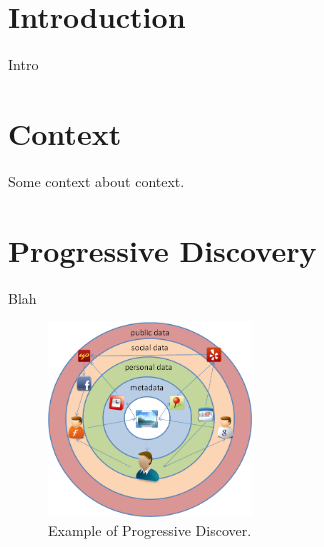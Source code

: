 \documentclass{sig-alternate}
\begin{document}


\section{Introduction}
Intro

\section{Context}
Some context about context.

\section{Progressive Discovery}
Blah \cite{westermann2007toward, gupta2011managing}



\begin{figure}[t]
\centering
\includegraphics[width=0.48\textwidth]{media/prog-discovery.png}
\caption{Example of Progressive Discover.}
\label{fig:cuenet-arch}
\end{figure}



\end{document}
